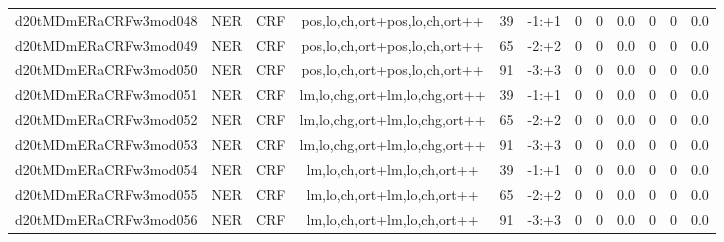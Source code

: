 \documentclass[a4paper]{article}
\begin{document}
\begin{landscape}
\begin{center}
\begin{tabular}{ |c|c|c|c|c|c|c|c|c|c|c|c|}
 
 	
 	\small{ d20tMDmERaCRFw3mod048 } & \small{ NER} & \small{  CRF }  & pos,lo,ch,ort+pos,lo,ch,ort++  &  39 &  \small{  -1:+1 }  &  0 & 0 & 0.0  &  0 & 0 & 0.0 \\
 	

 
 	
 	\small{ d20tMDmERaCRFw3mod049 } & \small{ NER} & \small{  CRF }  & pos,lo,ch,ort+pos,lo,ch,ort++  &  65 &  \small{  -2:+2 }  &  0 & 0 & 0.0  &  0 & 0 & 0.0 \\
 	

 
 	
 	\small{ d20tMDmERaCRFw3mod050 } & \small{ NER} & \small{  CRF }  & pos,lo,ch,ort+pos,lo,ch,ort++  &  91 &  \small{  -3:+3 }  &  0 & 0 & 0.0  &  0 & 0 & 0.0 \\
 	

 
 	
 	\small{ d20tMDmERaCRFw3mod051 } & \small{ NER} & \small{  CRF }  & lm,lo,chg,ort+lm,lo,chg,ort++  &  39 &  \small{  -1:+1 }  &  0 & 0 & 0.0  &  0 & 0 & 0.0 \\
 	

 
 	
 	\small{ d20tMDmERaCRFw3mod052 } & \small{ NER} & \small{  CRF }  & lm,lo,chg,ort+lm,lo,chg,ort++  &  65 &  \small{  -2:+2 }  &  0 & 0 & 0.0  &  0 & 0 & 0.0 \\
 	

 
 	
 	\small{ d20tMDmERaCRFw3mod053 } & \small{ NER} & \small{  CRF }  & lm,lo,chg,ort+lm,lo,chg,ort++  &  91 &  \small{  -3:+3 }  &  0 & 0 & 0.0  &  0 & 0 & 0.0 \\
 	

 
 	
 	\small{ d20tMDmERaCRFw3mod054 } & \small{ NER} & \small{  CRF }  & lm,lo,ch,ort+lm,lo,ch,ort++  &  39 &  \small{  -1:+1 }  &  0 & 0 & 0.0  &  0 & 0 & 0.0 \\
 	

 
 	
 	\small{ d20tMDmERaCRFw3mod055 } & \small{ NER} & \small{  CRF }  & lm,lo,ch,ort+lm,lo,ch,ort++  &  65 &  \small{  -2:+2 }  &  0 & 0 & 0.0  &  0 & 0 & 0.0 \\
 	

 
 	
 	\small{ d20tMDmERaCRFw3mod056 } & \small{ NER} & \small{  CRF }  & lm,lo,ch,ort+lm,lo,ch,ort++  &  91 &  \small{  -3:+3 }  &  0 & 0 & 0.0  &  0 & 0 & 0.0 \\
 	


\end{tabular}
\end{center}
\end{landscape}
\end{document}
